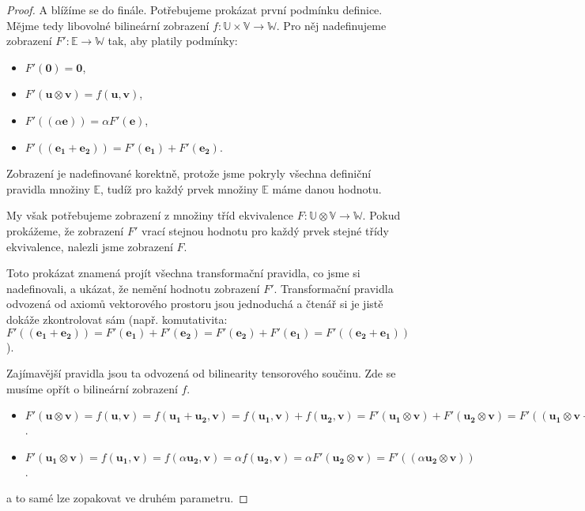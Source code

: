 \documentclass[a5paper,12pt]{amsbook}
\theoremstyle{definition}
\newcommand{\myvec}[1]{\bm{#1}}
\newcommand{\myspace}[1]{\mathbb{#1}}
\begin{document}
\begin{proof}
\medskip\noindent
A blížíme se do finále. Potřebujeme prokázat první podmínku definice. Mějme tedy
libovolné bilineární zobrazení $f:\myspace{U}\times\myspace{V}\rightarrow\myspace{W}$.
Pro něj nadefinujeme zobrazení $F':\myspace{E}\rightarrow\myspace{W}$
tak, aby platily podmínky:
\begin{itemize}
\item $F'(\myvec{0}) = \myvec{0}$,
\item $F'(\myvec{u}\otimes\myvec{v}) = f(\myvec{u}, \myvec{v})$,
\item $F'((\alpha\myvec{e})) = \alpha F'(\myvec{e})$,
\item $F'((\myvec{e_1} + \myvec{e_2})) = F'(\myvec{e_1}) + F'(\myvec{e_2})$.
\end{itemize}
Zobrazení je nadefinované korektně, protože jsme pokryly všechna definiční pravidla
množiny $\myspace{E}$, tudíž pro každý prvek množiny $\myspace{E}$ máme danou
hodnotu.

My však potřebujeme zobrazení z množiny tříd ekvivalence $F: \myspace{U}\otimes\myspace{V}
\rightarrow\myspace{W}$. Pokud prokážeme, že zobrazení $F'$ vrací stejnou hodnotu pro
každý prvek stejné třídy ekvivalence, nalezli jsme zobrazení $F$.

Toto prokázat znamená projít všechna transformační pravidla, co jsme si nadefinovali,
a ukázat, že nemění hodnotu zobrazení $F'$. Transformační pravidla odvozená od
axiomů vektorového prostoru jsou jednoduchá a čtenář si je jistě dokáže zkontrolovat
sám (např. komutativita: $F'((\myvec{e_1} + \myvec{e_2})) = F'(\myvec{e_1}) + F'(\myvec{e_2})
= F'(\myvec{e_2}) + F'(\myvec{e_1}) = F'((\myvec{e_2} + \myvec{e_1}))$).

Zajímavější pravidla jsou ta odvozená od bilinearity tensorového součinu. Zde se musíme
opřít o bilineární zobrazení $f$.
\begin{itemize}
\item $F'(\myvec{u}\otimes\myvec{v}) = f(\myvec{u}, \myvec{v}) 
= f(\myvec{u_1} + \myvec{u_2}, \myvec{v}) = f(\myvec{u_1}, \myvec{v}) 
+ f(\myvec{u_2}, \myvec{v}) = F'(\myvec{u_1}\otimes\myvec{v}) + F'(\myvec{u_2}\otimes\myvec{v})
= F'((\myvec{u_1}\otimes\myvec{v} + \myvec{u_2}\otimes\myvec{v}))$.
\item $F'(\myvec{u_1}\otimes\myvec{v}) = f(\myvec{u_1}, \myvec{v}) 
= f(\alpha\myvec{u_2}, \myvec{v}) = \alpha f(\myvec{u_2}, \myvec{v})
= \alpha F'(\myvec{u_2}\otimes\myvec{v}) = F'((\alpha \myvec{u_2}\otimes\myvec{v}))$.
\end{itemize}
a to samé lze zopakovat ve druhém parametru.


\end{proof}
\end{document}
